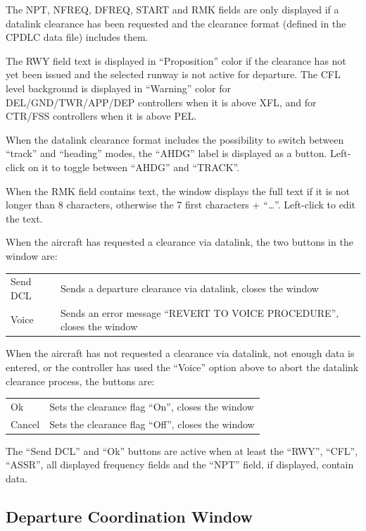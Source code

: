 \documentclass[11pt,a4paper,oldfontcommands]{memoir}
\begin{document}
The NPT, NFREQ, DFREQ, START and RMK fields are only displayed if a datalink clearance has been requested and the clearance format (defined in the CPDLC data file) includes them.

The RWY field text is displayed in “Proposition” color if the clearance has not yet been issued and the selected runway is not active for departure. The CFL level background is displayed in “Warning” color for DEL/GND/TWR/APP/DEP controllers when it is above XFL, and for CTR/FSS controllers when it is above PEL.

When the datalink clearance format includes the possibility to switch between “track” and “heading” modes, the “AHDG” label is displayed as a button. Left-click on it to toggle between “AHDG” and “TRACK”.

When the RMK field contains text, the window displays the full text if it is not longer than 8 characters, otherwise the 7 first characters + “…”. Left-click to edit the text.

When the aircraft has requested a clearance via datalink, the two buttons in the window are:

\begin{tabular}{l l}
    Send DCL    & Sends a departure clearance via datalink, closes the window\\
    Voice       & Sends an error message “REVERT TO VOICE PROCEDURE”, closes the window\\
\end{tabular}

When the aircraft has not requested a clearance via datalink, not enough data is entered, or the controller has used the “Voice” option above to abort the datalink clearance process, the buttons are:

\begin{tabular}{l l}
    Ok      & Sets the clearance flag “On”, closes the window\\
    Cancel  & Sets the clearance flag “Off”, closes the window\\
\end{tabular}

The “Send DCL” and “Ok” buttons are active when at least the “RWY”, “CFL”, “ASSR”, all displayed frequency fields and the “NPT” field, if displayed, contain data.

\subsection{Departure Coordination Window}
\label{win:dcw}
\end{document}
